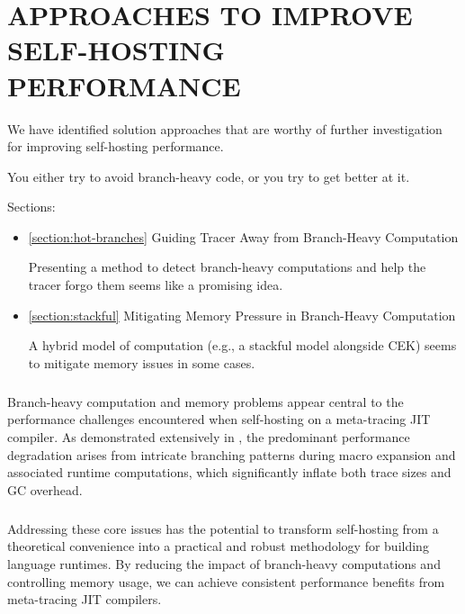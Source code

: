 \chapter[\texorpdfstring{APPROACHES TO IMPROVE SELF-HOSTING PERFORMANCE}
                          {7. Improving Performance}]{APPROACHES TO IMPROVE SELF-HOSTING PERFORMANCE}

	\label{chapter:solution}

  \begin{chaptersynopsis}
    We have identified solution approaches that are worthy of further investigation for improving self-hosting performance.

    You either try to avoid branch-heavy code, or you try to get better at it.

    Sections:
		\begin{itemize}
			\item \ref{section:hot-branches} Guiding Tracer Away from Branch-Heavy Computation

				Presenting a method to detect branch-heavy computations and help the tracer forgo them seems like a promising idea.
			\item \ref{section:stackful} Mitigating Memory Pressure in Branch-Heavy Computation

				A hybrid model of computation (e.g., a stackful model alongside CEK) seems to mitigate memory issues in some cases.
		\end{itemize}
  \end{chaptersynopsis}

  \paragraph{}%
    Branch-heavy computation and memory problems appear central to the performance challenges encountered when self-hosting on a meta-tracing JIT compiler. As demonstrated extensively in , the predominant performance degradation arises from intricate branching patterns during macro expansion and associated runtime computations, which significantly inflate both trace sizes and GC overhead.

  \paragraph{}%
    Addressing these core issues has the potential to transform self-hosting from a theoretical convenience into a practical and robust methodology for building language runtimes. By reducing the impact of branch-heavy computations and controlling memory usage, we can achieve consistent performance benefits from meta-tracing JIT compilers.

